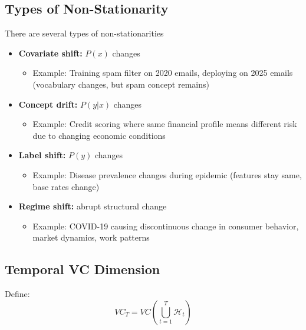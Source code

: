   \subsection*{Types of Non-Stationarity}

  There are several types of non-stationarities

  \begin{itemize}
    \item \textbf{Covariate shift:} $P(x)$ changes
      \begin{itemize}
        \item Example: Training spam filter on 2020 emails, deploying on
          2025 emails (vocabulary changes, but spam concept remains)
      \end{itemize}

    \item \textbf{Concept drift:} $P(y|x)$ changes
      \begin{itemize}
        \item Example: Credit scoring where same financial profile means
          different risk due to changing economic conditions
      \end{itemize}

    \item \textbf{Label shift:} $P(y)$ changes
      \begin{itemize}
        \item Example: Disease prevalence changes during epidemic (features
          stay same, base rates change)
      \end{itemize}

    \item \textbf{Regime shift:} abrupt structural change
      \begin{itemize}
        \item Example: COVID-19 causing discontinuous change in consumer
          behavior, market dynamics, work patterns
      \end{itemize}
  \end{itemize}

  \subsection*{Temporal VC Dimension}

  Define:
  $$
    VC_{T}= VC\left(\bigcup_{t=1}^{T}\mathcal{H}_{t}\right)
  $$

